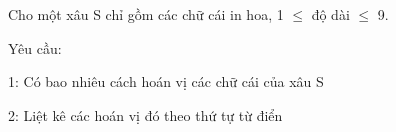Cho một xâu S chỉ gồm các chữ cái in hoa, 1  $\le$  độ dài  $\le$  9.  

   Yêu cầu:  

   1: Có bao nhiêu cách hoán vị các chữ cái của xâu S  

   2: Liệt kê các hoán vị đó theo thứ tự từ điển  

\